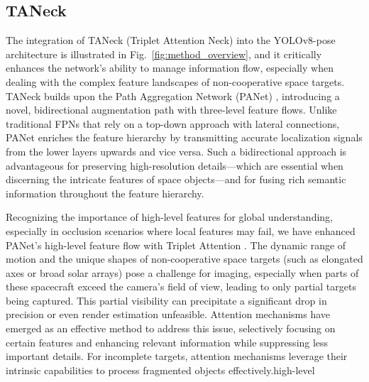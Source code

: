 \documentclass[a4paper,fleqn]{cas-sc}
\begin{document}
\subsection{TANeck}
The integration of TANeck (Triplet Attention Neck) into the YOLOv8-pose architecture is illustrated in Fig.~\ref{fig:method_overview}, and it critically enhances the network’s ability to manage information flow, especially when dealing with the complex feature landscapes of non-cooperative space targets. TANeck builds upon the Path Aggregation Network (PANet) \citep{panet}, introducing a novel, bidirectional augmentation path with three-level feature flows. Unlike traditional FPNs \citep{fpn} that rely on a top-down approach with lateral connections, PANet enriches the feature hierarchy by transmitting accurate localization signals from the lower layers upwards and vice versa. Such a bidirectional approach is advantageous for preserving high-resolution details—which are essential when discerning the intricate features of space objects—and for fusing rich semantic information throughout the feature hierarchy. 

Recognizing the importance of high-level features for global understanding, especially in occlusion scenarios where local features may fail, we have enhanced PANet's high-level feature flow with Triplet Attention \citep{triplet}. The dynamic range of motion and the unique shapes of non-cooperative space targets (such as elongated axes or broad solar arrays) pose a challenge for imaging, especially when parts of these spacecraft exceed the camera's field of view, leading to only partial targets being captured. This partial visibility can precipitate a significant drop in precision or even render estimation unfeasible. Attention mechanisms have emerged as an effective method to address this issue, selectively focusing on certain features and enhancing relevant information while suppressing less important details. For incomplete targets, attention mechanisms leverage their intrinsic capabilities to process fragmented objects effectively.high-level
\end{document}

